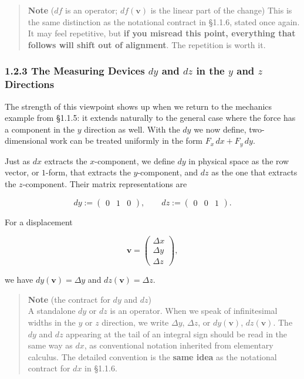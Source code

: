 \documentclass[a4paper,12pt,openany]{book}
\begin{document}
\begin{quote}
\textbf{Note} (\(df\) is an operator; \(df(\mathbf{v})\) is the linear
part of the change) This is the same distinction as the notational
contract in §1.1.6, stated once again. It may feel repetitive, but
\textbf{if you misread this point, everything that follows will shift out of alignment}.
The repetition is worth it.
\end{quote}

\hypertarget{the-measuring-devices-dy-and-dz-in-the-y-and-z-directions}{%
\subsubsection{\texorpdfstring{1.2.3 The Measuring Devices \(dy\) and
\(dz\) in the \(y\) and \(z\)
Directions}{1.2.3 The Measuring Devices dy and dz in the y and z Directions}}\label{the-measuring-devices-dy-and-dz-in-the-y-and-z-directions}}

The strength of this viewpoint shows up when we return to the mechanics
example from §1.1.5: it extends naturally to the general case where the
force has a component in the \(y\) direction as well. With the \(dy\) we
now define, two-dimensional work can be treated uniformly in the form
\(F_x\,dx+F_y\,dy\).

Just as \(dx\) extracts the \(x\)-component, we define \(dy\) in
physical space as the row vector, or \(1\)-form, that extracts the
\(y\)-component, and \(dz\) as the one that extracts the
\(z\)-component. Their matrix representations are

\[
dy:=\begin{pmatrix}0&1&0\end{pmatrix},\qquad
dz:=\begin{pmatrix}0&0&1\end{pmatrix}.
\]

For a displacement

\[
\mathbf{v}=\begin{pmatrix}\Delta x\\\Delta y\\\Delta z\end{pmatrix},
\]

we have \(dy(\mathbf{v})=\Delta y\) and \(dz(\mathbf{v})=\Delta z\).

\begin{quote}
\textbf{Note} (the contract for \(dy\) and \(dz\))\\
A standalone \(dy\) or \(dz\) is an operator. When we speak of
infinitesimal widths in the \(y\) or \(z\) direction, we write
\(\Delta y\), \(\Delta z\), or \(dy(\mathbf{v})\), \(dz(\mathbf{v})\).
The \(dy\) and \(dz\) appearing at the tail of an integral sign should
be read in the same way as \(dx\), as conventional notation inherited
from elementary calculus. The detailed convention is the
\textbf{same idea} as the notational contract for \(dx\) in §1.1.6.
\end{quote}
\end{document}
